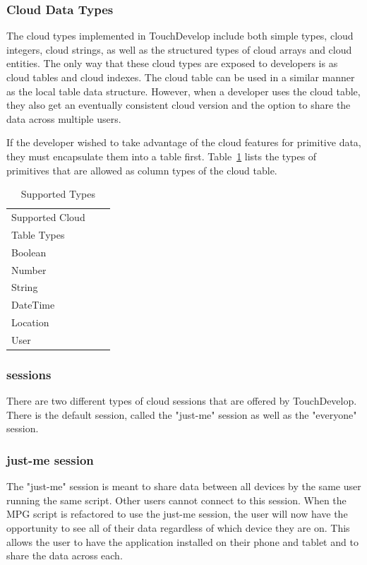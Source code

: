 \documentclass{sigplanconf}
\begin{document}
\subsubsection{Cloud Data Types}
The cloud types implemented in TouchDevelop include both simple types, cloud integers, cloud strings, as well as the structured types of cloud arrays and cloud entities.   The only way that these cloud types are exposed to developers is as cloud tables and cloud indexes.  The cloud table can be used in a similar manner as the local table data structure.  However, when a developer uses the cloud table, they also get an eventually consistent cloud version and the option to share the data across multiple users.

If the developer wished to take advantage of the cloud features for primitive data, they must encapsulate them into a table first.  Table~\ref{table:supportedTypes} lists the types of primitives that are allowed as column types of the cloud table.

\begin{table}[htb!]
\begin{center}
\begin{tabular}{lcl}
  Supported Cloud \\
  Table Types  \\
   \hline
Boolean  \\
Number \\
String  \\
DateTime  \\
Location  \\
User  \\
\end{tabular}
\nocaptionrule
\caption{Supported Types}
\label{table:supportedTypes}
\end{center}
\end{table}%



\subsubsection{sessions}
There are two different types of cloud sessions that are offered by TouchDevelop.  There is the default session, called the "just-me" session as well as the "everyone" session.  \subsubsection{just-me session}
The "just-me" session is meant to share data between all devices by the same user running the same script.  Other users cannot connect to this session.  When the MPG script is refactored to use the just-me session, the user will now have the opportunity to see all of their data regardless of which device they are on. This allows the user to have the application installed on their phone and tablet and to share the data across each. 
\end{document}
